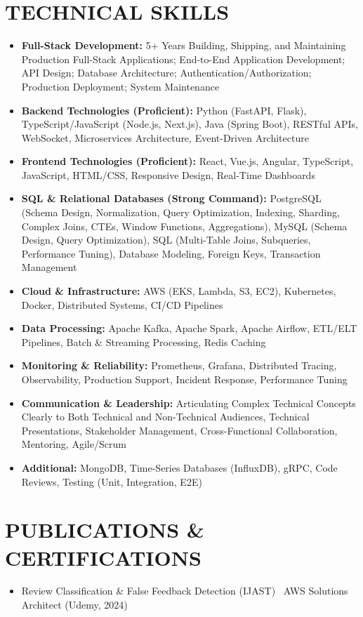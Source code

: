 \documentclass[letterpaper,10pt]{article}
\newcommand{\resumeItem}[1]{\item\small #1}
\begin{document}
\section{\textcolor{metablue}{TECHNICAL SKILLS}}
\vspace{-5pt}
\small
\begin{itemize}
\resumeItem{\textbf{Full-Stack Development:} 5+ Years Building, Shipping, and Maintaining Production Full-Stack Applications; End-to-End Application Development; API Design; Database Architecture; Authentication/Authorization; Production Deployment; System Maintenance}
\resumeItem{\textbf{Backend Technologies (Proficient):} Python (FastAPI, Flask), TypeScript/JavaScript (Node.js, Next.js), Java (Spring Boot), RESTful APIs, WebSocket, Microservices Architecture, Event-Driven Architecture}
\resumeItem{\textbf{Frontend Technologies (Proficient):} React, Vue.js, Angular, TypeScript, JavaScript, HTML/CSS, Responsive Design, Real-Time Dashboards}
\resumeItem{\textbf{SQL \& Relational Databases (Strong Command):} PostgreSQL (Schema Design, Normalization, Query Optimization, Indexing, Sharding, Complex Joins, CTEs, Window Functions, Aggregations), MySQL (Schema Design, Query Optimization), SQL (Multi-Table Joins, Subqueries, Performance Tuning), Database Modeling, Foreign Keys, Transaction Management}
\resumeItem{\textbf{Cloud \& Infrastructure:} AWS (EKS, Lambda, S3, EC2), Kubernetes, Docker, Distributed Systems, CI/CD Pipelines}
\resumeItem{\textbf{Data Processing:} Apache Kafka, Apache Spark, Apache Airflow, ETL/ELT Pipelines, Batch \& Streaming Processing, Redis Caching}
\resumeItem{\textbf{Monitoring \& Reliability:} Prometheus, Grafana, Distributed Tracing, Observability, Production Support, Incident Response, Performance Tuning}
\resumeItem{\textbf{Communication \& Leadership:} Articulating Complex Technical Concepts Clearly to Both Technical and Non-Technical Audiences, Technical Presentations, Stakeholder Management, Cross-Functional Collaboration, Mentoring, Agile/Scrum}
\resumeItem{\textbf{Additional:} MongoDB, Time-Series Databases (InfluxDB), gRPC, Code Reviews, Testing (Unit, Integration, E2E)}
\end{itemize}
\vspace{-10pt}

\section{\textcolor{metablue}{PUBLICATIONS \& CERTIFICATIONS}}
\vspace{-5pt}
\begin{itemize}
\resumeItem{Review Classification \& False Feedback Detection (IJAST) \textbar\ AWS Solutions Architect (Udemy, 2024)}
\end{itemize}
\end{document}
